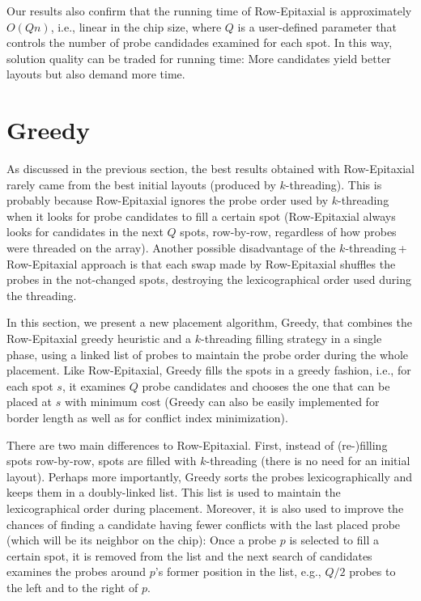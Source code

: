 Our results also confirm that the running time of Row-Epitaxial is approximately
$O(Qn)$, i.e., linear in the chip size, where $Q$ is a user-defined parameter
that controls the number of probe candidades examined for each spot. In this
way, solution quality can be traded for running time: More candidates yield
better layouts but also demand more time.

\section{Greedy}
\label{sec:placement_greedy}

As discussed in the previous section, the best results obtained with
Row-Epitaxial rarely came from the best initial layouts (produced by
$k$-threading). This is probably because Row-Epitaxial ignores the probe order
used by $k$-threading when it looks for probe candidates to fill a certain spot
(Row-Epitaxial always looks for candidates in the next $Q$ spots, row-by-row,
regardless of how probes were threaded on the array). Another possible
disadvantage of the $k$-threading\,+\,Row-Epitaxial approach is that each swap
made by Row-Epitaxial shuffles the probes in the not-changed spots, destroying
the lexicographical order used during the threading.

In this section, we present a new placement algorithm, Greedy, that combines the
Row-Epitaxial greedy heuristic and a $k$-threading filling strategy in a single
phase, using a linked list of probes to maintain the probe order during the
whole placement. Like Row-Epitaxial, Greedy fills the spots in a greedy fashion,
i.e., for each spot $s$, it examines $Q$ probe candidates and chooses the one
that can be placed at $s$ with minimum cost (Greedy can also be easily
implemented for border length as well as for conflict index minimization).

There are two main differences to Row-Epitaxial. First, instead of (re-)filling
spots row-by-row, spots are filled with $k$-threading (there is no need for an
initial layout). Perhaps more importantly, Greedy sorts the probes
lexicographically and keeps them in a doubly-linked list. This list is used to
maintain the lexicographical order during placement. Moreover, it is also used
to improve the chances of finding a candidate having fewer conflicts with the
last placed probe (which will be its neighbor on the chip): Once a probe $p$ is
selected to fill a certain spot, it is removed from the list and the next search
of candidates examines the probes around $p$'s former position in the list,
e.g., $Q/2$ probes to the left and to the right of $p$.

